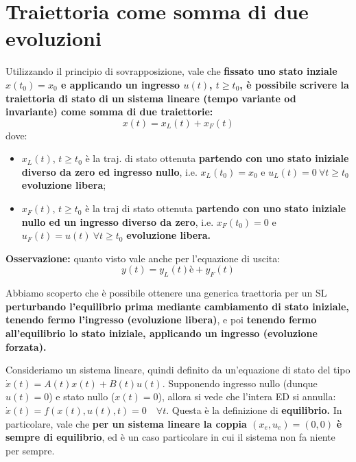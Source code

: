 \documentclass[a4paper]{report}
\begin{document}
\section{Traiettoria come somma di due evoluzioni}
\label{sec:traj_somma_evoluz}
\begin{defin}{}{}
Utilizzando il principio di sovrapposizione, vale che \textbf{fissato uno stato inziale $x(t_0) = x_0$ e applicando un ingresso $u(t)$, $t \geq t_0$, è possibile scrivere la traiettoria di stato di un sistema lineare (tempo variante od invariante) come somma di due traiettorie:}
\begin{equation}
	x(t) = x_L(t) +x_F(t)
\end{equation}
dove:
\begin{itemize}
	\item  $x_L(t)$, $t \geq t_0$ è la traj. di stato ottenuta \textbf{partendo con uno stato iniziale diverso da zero ed ingresso nullo}, i.e. $x_L(t_0) = x_0$ e $u_L(t) = 0 \ \forall t \geq t_0$ \rarr \textbf{evoluzione libera};
	\item $x_F(t)$, $t \geq t_0$ è la traj di stato ottenuta \textbf{partendo con uno stato iniziale nullo ed un ingresso diverso da zero}, i.e. $x_F(t_0) = 0$ e $u_F(t) = u(t) \ \forall t \geq t_0$ \rarr \textbf{evoluzione libera.}
\end{itemize}
\textbf{Osservazione:} quanto visto vale anche per l'equazione di uscita:
\begin{equation}
y(t) = y_L(t) è+ y_F(t)
\end{equation}
\end{defin}
Abbiamo scoperto che è possibile ottenere una generica traettoria per un SL \textbf{perturbando l'equilibrio prima mediante cambiamento di stato iniziale,  tenendo fermo l'ingresso (evoluzione libera)}, e poi \textbf{tenendo fermo all'equilibrio lo stato iniziale, applicando un ingresso (evoluzione forzata).} 

\begin{prop}
\label{prop:sl_coppia_nulla_eq}
	Consideriamo un sistema lineare, quindi definito da un'equazione di stato del tipo $\dot x(t) = A(t)x(t) + B(t)u(t).$ Supponendo ingresso nullo (dunque $u(t) = 0$)  e stato nullo ($x(t)=0$), allora si vede che l'intera ED si annulla: $\dot x(t) = f(x(t), u(t), t) = 0 \quad \forall t$. Questa è la definizione di \textbf{equilibrio.} In particolare, vale che \textbf{per un sistema lineare la coppia  $(x_e,u_e) = (0,0)$} \textbf{è sempre di equilibrio}, ed è un caso particolare  in cui il sistema non fa niente per sempre.
\end{prop}
\end{document}

